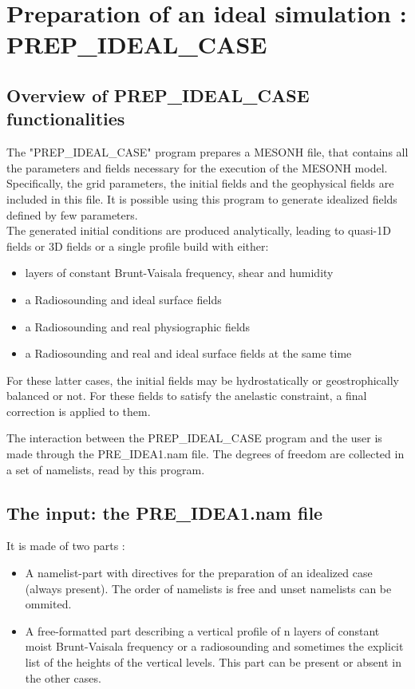 \chapter{Preparation of an ideal simulation : PREP\_IDEAL\_CASE}\label{c:PREPIDEAL}

\section{Overview of PREP\_IDEAL\_CASE functionalities}


The "PREP\_IDEAL\_CASE" program  prepares a MESONH file, that contains all the
parameters and fields necessary for the execution of the MESONH model.
Specifically, the grid parameters, the initial fields and the geophysical fields
are included in this file. It is possible using this program to generate
idealized fields defined by few parameters.\\ 

The generated initial conditions are produced analytically, leading to 
 quasi-1D fields or 3D fields or a single profile build with either:
\begin{itemize}
\item
layers of constant Brunt-Vaisala frequency, shear  and 
humidity  
\item a Radiosounding and ideal surface fields
\item a Radiosounding and real physiographic fields 
\item
a Radiosounding and real and ideal surface fields at the same time
\end{itemize}

For these latter cases, the initial fields may be  hydrostatically or
geostrophically  balanced or not.
For these fields to satisfy the anelastic constraint, a final correction is
applied to them.


The interaction between the PREP\_IDEAL\_CASE program and the user is made through 
the PRE\_IDEA1.nam file. The degrees of freedom  are collected in a set of
namelists,  read by this program. 

\newpage
\section {The input: the PRE\_IDEA1.nam file}

It is made  of  two parts :

\begin{itemize}
\item A namelist-part with directives for the preparation
of an idealized case (always present).  The
order of namelists is free and unset namelists can be ommited.
\item A free-formatted part describing
a vertical profile of n layers of constant moist Brunt-Vaisala frequency or
a radiosounding and sometimes the explicit list of the heights of the vertical
levels. This part can be present or absent in the other cases.

\end{itemize}

